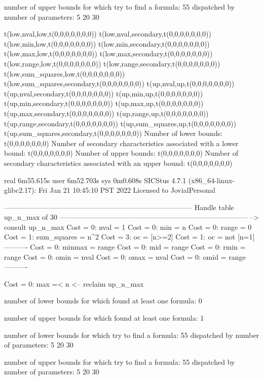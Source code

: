number of upper bounds for which try to find a formula: 55
dispatched by number of parameters: 5  20  30

t(low,nval,low,t(0,0,0,0,0,0,0))
t(low,nval,secondary,t(0,0,0,0,0,0,0))
t(low,min,low,t(0,0,0,0,0,0,0))
t(low,min,secondary,t(0,0,0,0,0,0,0))
t(low,max,low,t(0,0,0,0,0,0,0))
t(low,max,secondary,t(0,0,0,0,0,0,0))
t(low,range,low,t(0,0,0,0,0,0,0))
t(low,range,secondary,t(0,0,0,0,0,0,0))
t(low,sum_squares,low,t(0,0,0,0,0,0,0))
t(low,sum_squares,secondary,t(0,0,0,0,0,0,0))
t(up,nval,up,t(0,0,0,0,0,0,0))
t(up,nval,secondary,t(0,0,0,0,0,0,0))
t(up,min,up,t(0,0,0,0,0,0,0))
t(up,min,secondary,t(0,0,0,0,0,0,0))
t(up,max,up,t(0,0,0,0,0,0,0))
t(up,max,secondary,t(0,0,0,0,0,0,0))
t(up,range,up,t(0,0,0,0,0,0,0))
t(up,range,secondary,t(0,0,0,0,0,0,0))
t(up,sum_squares,up,t(0,0,0,0,0,0,0))
t(up,sum_squares,secondary,t(0,0,0,0,0,0,0))
Number of lower bounds:                                             t(0,0,0,0,0,0,0)
Number of secondary characteristics associated with a lower bound:  t(0,0,0,0,0,0,0)
Number of upper bounds:                                             t(0,0,0,0,0,0,0)
Number of secondary characteristics associated with an upper bound: t(0,0,0,0,0,0,0)

real	6m55.615s
user	6m52.703s
sys	0m0.608s
SICStus 4.7.1 (x86_64-linux-glibc2.17): Fri Jan 21 10:45:10 PST 2022
Licensed to JovialPersonal


--------------------------------------------------------------------------------
Handle table up_n_max of 30
--------------------------------------------------------------------------------
--> consult up_n_max
Cost =  0:  nval        = 1
Cost =  0:  min         = n
Cost =  0:  range       = 0
Cost =  1:  sum_squares = n^2
Cost =  3:  oc          = [n>=2]
Cost =  1:  oc          = not [n=1]
----------
Cost =  0:  minmax      = range
Cost =  0:  mid         = range
Cost =  0:  rmin        = range
Cost =  0:  omin        = nval
Cost =  0:  omax        = nval
Cost =  0:  omid        = range
----------

Cost =  0:  max =< n
<-- reclaim up_n_max

number of lower bounds for which found at least one formula: 0

number of upper bounds for which found at least one formula: 1

number of lower bounds for which try to find a formula: 55
dispatched by number of parameters: 5  20  30

number of upper bounds for which try to find a formula: 55
dispatched by number of parameters: 5  20  30

